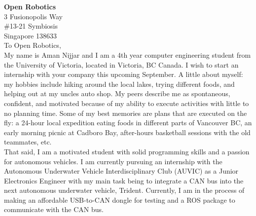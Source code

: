 \documentclass[10pt,a4paper,ragged2e,withhyper]{altacv}
\begin{document}

\makecvheader


\textbf{\color{VividPurple}Open Robotics}\\
3 Fusionopolis Way \\ 
\#13-21 Symbiosis \\ 
Singapore 138633  \linebreak \\



To Open Robotics, \linebreak \\

My name is Aman Nijjar and I am a 4th year computer engineering student from the University of Victoria, located in Victoria, BC Canada. I wish to start an internship with your company this upcoming September. A little about myself: my hobbies include hiking around the local lakes, trying different foods, and helping out at my uncles auto shop. My peers describe me as spontaneous, confident, and motivated because of my ability to execute activities with little to no planning time. Some of my best memories are plans that are executed on the fly: a 24-hour local expedition eating foods in different parts of Vancouver BC, an early morning picnic at Cadboro Bay, after-hours basketball sessions with the old teammates, etc. \linebreak \\

That said, I am a motivated student with solid programming skills and a passion for autonomous vehicles. I am currently pursuing an internship with the Autonomous Underwater Vehicle Interdisciplinary Club (AUVIC) as a Junior Electronics Engineer with my main task being to integrate a CAN bus into the next autonomous underwater vehicle, Trident. Currently, I am in the process of making an affordable USB-to-CAN dongle for testing and a ROS package to communicate with the CAN bus. \linebreak \\
\end{document}
